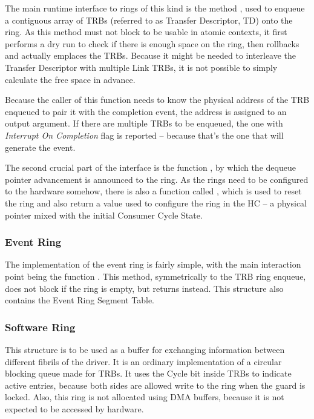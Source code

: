 The main runtime interface to rings of this kind is the method
, used to enqueue a contiguous array of
TRBs (referred to as Transfer Descriptor, TD) onto the ring. As this method
must not block to be usable in atomic contexts, it first performs a dry run to
check if there is enough space on the ring, then rollbacks and actually
emplaces the TRBs. Because it might be needed to interleave the Transfer
Descriptor with multiple Link TRBs, it is not possible to simply calculate the
free space in advance.

Because the caller of this function needs to know the physical address of the
TRB enqueued to pair it with the completion event, the address is assigned to
an output argument. If there are multiple TRBs to be enqueued, the one with
\emph{Interrupt On Completion} flag is reported -- because that's the one that
will generate the event.

The second crucial part of the interface is the function
, by which the dequeue pointer advancement is
announced to the ring. As the rings need to be configured to the hardware
somehow, there is also a function called
, which is used to reset the ring and
also return a value used to configure the ring in the HC -- a physical pointer
mixed with the initial Consumer Cycle State.

\subsubsection{Event Ring}

The implementation of the event ring is fairly simple, with the main
interaction point being the function . This
method, symmetrically to the TRB ring enqueue, does not block if the ring is
empty, but returns  instead. This structure also contains the
Event Ring Segment Table.

\subsubsection{Software Ring}
\label{sec:sw-rings}

This structure is to be used as a buffer for exchanging information between
different fibrils of the driver. It is an ordinary implementation of a circular
blocking queue made for TRBs. It uses the Cycle bit inside TRBs to indicate
active entries, because both sides are allowed write to the ring when the guard
is locked. Also, this ring is not allocated using DMA buffers, because it is
not expected to be accessed by hardware.
